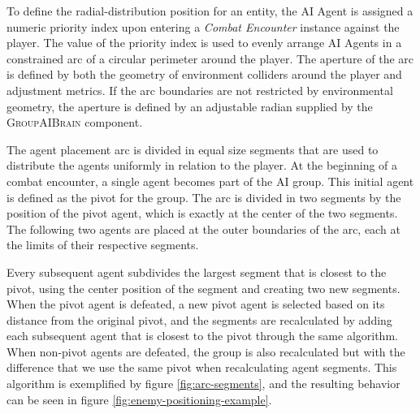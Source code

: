 To define the radial-distribution position for an entity, the AI Agent is assigned a numeric priority index upon entering a \emph{Combat Encounter} instance against the player. The value of the priority index is used to evenly arrange AI Agents in a constrained arc of a circular perimeter around the player. The aperture of the arc is defined by both the geometry of environment colliders around the player and adjustment metrics. If the arc boundaries are not restricted by environmental geometry, the aperture is defined by an adjustable radian supplied by the \textsc{GroupAIBrain} component.

The agent placement arc is divided in equal size segments that are used to distribute the agents uniformly in relation to the player. At the beginning of a combat encounter, a single agent becomes part of the AI group. This initial agent is defined as the pivot for the group. The arc is divided in two segments by the position of the pivot agent, which is exactly at the center of the two segments. The following two agents are placed at the outer boundaries of the arc, each at the limits of their respective segments.

Every subsequent agent subdivides the largest segment that is closest to the pivot, using the center position of the segment and creating two new segments. When the pivot agent is defeated, a new pivot agent is selected based on its distance from the original pivot, and the segments are recalculated by adding each subsequent agent that is closest to the pivot through the same algorithm. When non-pivot agents are defeated, the group is also recalculated but with the difference that we use the same pivot when recalculating agent segments. This algorithm is exemplified by figure \ref{fig:arc-segments}, and the resulting behavior can be seen in figure \ref{fig:enemy-positioning-example}.





